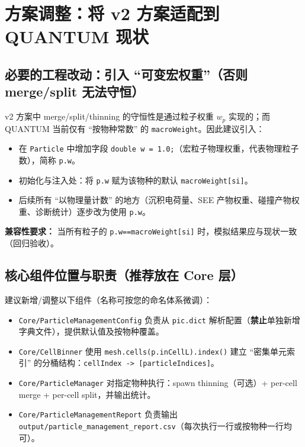 \documentclass[UTF8,11pt,a4paper]{ctexart}
\begin{document}
\section{方案调整：将 v2 方案适配到 QUANTUM 现状}

\subsection{必要的工程改动：引入 ``可变宏权重''（否则 merge/split 无法守恒）}
v2 方案中 merge/split/thinning 的守恒性是通过粒子权重 $w_p$ 实现的；而 QUANTUM 当前仅有 ``按物种常数'' 的 \texttt{macroWeight}。因此建议引入：
\begin{itemize}[itemsep=2pt]
  \item 在 \texttt{Particle} 中增加字段 \texttt{double w = 1.0;}（宏粒子物理权重，代表物理粒子数），简称 \texttt{p.w}。
  \item 初始化与注入处：将 \texttt{p.w} 赋为该物种的默认 \texttt{macroWeight[si]}。
  \item 后续所有 ``以物理量计数'' 的地方（沉积电荷量、SEE 产物权重、碰撞产物权重、诊断统计）逐步改为使用 \texttt{p.w}。
\end{itemize}
\textbf{兼容性要求：} 当所有粒子的 \texttt{p.w==macroWeight[si]} 时，模拟结果应与现状一致（回归验收）。

\subsection{核心组件位置与职责（推荐放在 Core 层）}
建议新增/调整以下组件（名称可按您的命名体系微调）：
\begin{itemize}[itemsep=2pt]
  \item \texttt{Core/ParticleManagementConfig}\newline
  负责从 \texttt{pic.dict} 解析配置（\textbf{禁止}单独新增字典文件），提供默认值及按物种覆盖。
  \item \texttt{Core/CellBinner}\newline
  使用 \texttt{mesh.cells(p.inCellL).index()} 建立 ``密集单元索引'' 的分桶结构：\texttt{cellIndex -> [particleIndices]}。
  \item \texttt{Core/ParticleManager}\newline
  对指定物种执行：spawn thinning（可选）+ per-cell merge + per-cell split，并输出统计。
  \item \texttt{Core/ParticleManagementReport}\newline
  负责输出 \texttt{output/particle\_management\_report.csv}（每次执行一行或按物种一行均可）。
\end{itemize}
\end{document}
